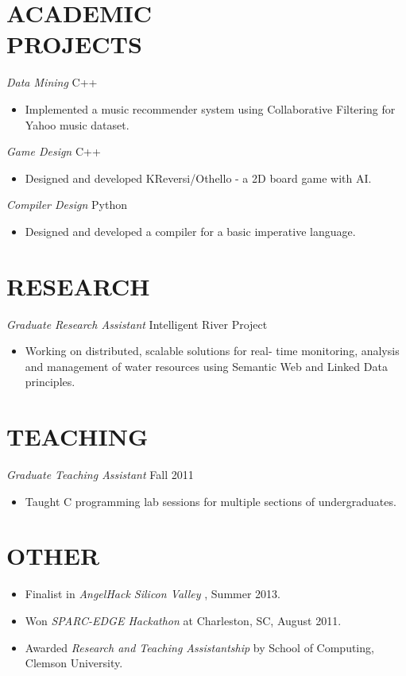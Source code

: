 \documentclass[line,margin]{res}
\begin{document}
\begin{resume}
 
\section{ACADEMIC \\ PROJECTS}  {\sl Data Mining} \hfill        C++
                 \begin{itemize}  \itemsep -2pt %
                 \item Implemented a music recommender system using Collaborative Filtering for Yahoo music dataset.
                 \end{itemize} 
                {\sl Game Design}  \hfill        C++
                  \begin{itemize} \itemsep -2pt
                   \item Designed and developed KReversi/Othello - a 2D board game with AI.        
                   \end{itemize} 
                   {\sl Compiler Design}  \hfill        Python
                  \begin{itemize} \itemsep -2pt
                   \item Designed and developed a compiler for a basic imperative language.       
                   \end{itemize}
 
\section{RESEARCH}  {\sl Graduate Research Assistant} \hfill        Intelligent River\textsuperscript{\textregistered} Project
 					\begin{itemize}  \itemsep -2pt
 					\item Working on distributed, scalable solutions for real- time monitoring, analysis and management of water resources using Semantic Web and Linked Data principles.
					\end{itemize}

\section{TEACHING}  {\sl Graduate Teaching Assistant} \hfill        Fall 2011
 					\begin{itemize}  \itemsep -2pt
 					\item Taught C programming lab sessions for multiple sections of undergraduates.
					\end{itemize}
					

\section{OTHER}
			\begin{itemize}  \itemsep -2pt             
            \item Finalist in {\it AngelHack Silicon Valley} , Summer 2013.
            \item Won {\it SPARC-EDGE Hackathon} at Charleston, SC, August 2011.
            \item Awarded {\it Research and Teaching Assistantship} by School of Computing, Clemson University.
            \end{itemize}
\end{resume}
\end{document}

